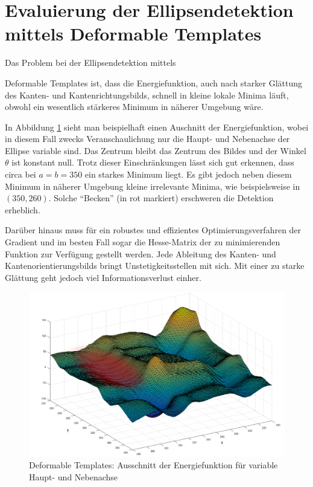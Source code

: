 \section{Evaluierung der Ellipsendetektion mittels Deformable Templates}
Das Problem bei der Ellipsendetektion mittels {Deformable Templates ist, dass die Energiefunktion, auch nach starker Glättung des Kanten- und Kantenrichtungsbilds, schnell in kleine lokale Minima läuft, obwohl ein wesentlich stärkeres Minimum in näherer Umgebung wäre.

In Abbildung \ref{fig:deformable} sieht man beispielhaft einen Auschnitt der Energiefunktion, wobei in diesem Fall zwecks Veranschaulichung nur die Haupt- und Nebenachse der Ellipse variable sind. Das Zentrum bleibt das Zentrum des Bildes und der Winkel $\theta$ ist konstant null. Trotz dieser Einschränkungen lässt sich gut erkennen, dass circa bei $a = b = 350$ ein starkes Minimum liegt. Es gibt jedoch neben diesem Minimum in näherer Umgebung kleine irrelevante Minima, wie beispielsweise in $(350, 260)$. Solche "`Becken"' (in rot markiert) erschweren die Detektion erheblich.

Darüber hinaus muss für ein robustes und effizientes Optimierungsverfahren der Gradient und im besten Fall sogar die Hesse-Matrix der zu minimierenden Funktion zur Verfügung gestellt werden.  Jede Ableitung des Kanten- und Kantenorientierungsbilds bringt Unstetigkeitsstellen mit sich. Mit einer zu starke Glättung geht jedoch viel Informationsverlust einher.


\begin{figure}[!htb]
	\centering
	\includegraphics[scale=.4]{images/deformableHighlighted.png}
	\caption{Deformable Templates: Ausschnitt der Energiefunktion für variable Haupt- und Nebenachse}
	\label{fig:deformable}
\end{figure}


}
